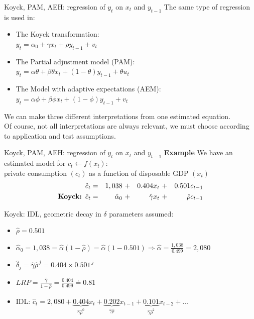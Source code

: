 \documentclass{beamer}
\begin{document}

\begin{frame}{Koyck, PAM, AEH: regression of $y_t$ on $x_t$ and $y_{t-1}$}
The same type of regression is used in:

\begin{itemize}
\item The Koyck transformation:\\
$y_t = \alpha_0 + \gamma x_t + \rho y_{t-1} + v_t$\\
\smallskip
\item The Partial adjustment model (PAM):\\
$y_t = \alpha \theta + \beta \theta x_t + (1-\theta) y_{t-1} + \theta u_t$\\
\smallskip
\item The Model with adaptive expectations (AEM):\\
$y_t = \alpha \phi + \beta \phi x_{t} + (1-\phi) y_{t-1} + v_t $\\

\end{itemize}
\vspace{0.3cm}
We can make three different interpretations from one estimated equation.\\
\vspace{0.3cm}
Of course, not all interpretations are always relevant, we must choose according to application and test assumptions.
\end{frame}
\begin{frame}{Koyck, PAM, AEH: regression of $y_t$ on $x_t$ and $y_{t-1}$}
\textbf{Example} We have an estimated model for $c_t \leftarrow f(x_t)$:\\
private consumption $(c_t)$ as a function of disposable GDP $(x_t)$
\begin{equation*}
\begin{aligned}
\hat{c}_t & = &1,038~&+ &0.404 x_t~ &+ &0.501 c_{t-1} \\
\textnormal{\textbf{Koyck:}} \,\,\, \hat{c}_t & = &\hat{\alpha}_0~&+ &\hat{\gamma} x_t~ &+ &\hat{\rho} c_{t-1} 
\end{aligned}
\end{equation*}

Koyck: IDL, geometric decay in $\delta$ parameters assumed:
\begin{itemize}
\item $\hat{\rho}=0.501$
\smallskip
\item $\hat{\alpha}_0 = 1,038 = \hat{\alpha}(1-\hat{\rho}) = \hat{\alpha}(1-0.501) 
\Rightarrow \hat{\alpha}= \frac{1,038}{0.499}=2,080$
\item $\hat{\delta}_j = \hat{\gamma} \hat{\rho}^{\,j}=0.404 \times 0.501^{\,j}$
\smallskip
\item $\textit{LRP}=\frac{\hat{\gamma}}{1-\hat{\rho}}= \frac{0.404}{0.499} \doteq 0.81 $
\smallskip
\item IDL: $\hat{c}_t = 2,080 + \underbrace{0.404}_{\hat{\gamma} \hat{\rho}^{0}} x_t + \underbrace{0.202}_{\hat{\gamma} \hat{\rho}} x_{t-1} 
+ \underbrace{0.101}_{\hat{\gamma} \hat{\rho}^{2}} x_{t-2} + \dots$
\end{itemize}
\end{frame}
\end{document}

